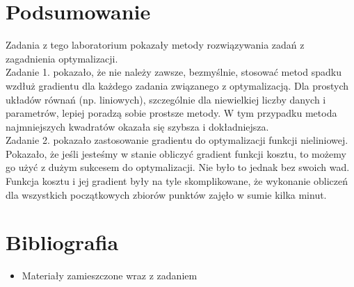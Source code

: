 \documentclass{article}
\begin{document}
\section{Podsumowanie}
Zadania z tego laboratorium pokazały metody rozwiązywania zadań z zagadnienia optymalizacji.
\\
Zadanie 1. pokazało, że nie należy zawsze, bezmyślnie, stosować metod spadku wzdłuż gradientu dla każdego zadania związanego z optymalizacją. Dla prostych układów równań (np. liniowych), szczególnie dla niewielkiej liczby danych i parametrów, lepiej poradzą sobie prostsze metody. W tym przypadku metoda najmniejszych kwadratów okazała się szybsza i dokładniejsza.
\\
Zadanie 2. pokazało zastosowanie gradientu do optymalizacji funkcji nieliniowej. Pokazało, że jeśli jesteśmy w stanie obliczyć gradient funkcji kosztu, to możemy go użyć z dużym sukcesem do optymalizacji. Nie było to jednak bez swoich wad. Funkcja kosztu i jej gradient były na tyle skomplikowane, że wykonanie obliczeń dla wszystkich początkowych zbiorów punktów zajęło w sumie kilka minut.
\section{Bibliografia}
\begin{itemize}
\item Materiały zamieszczone wraz z zadaniem
\end{itemize}
\end{document}
